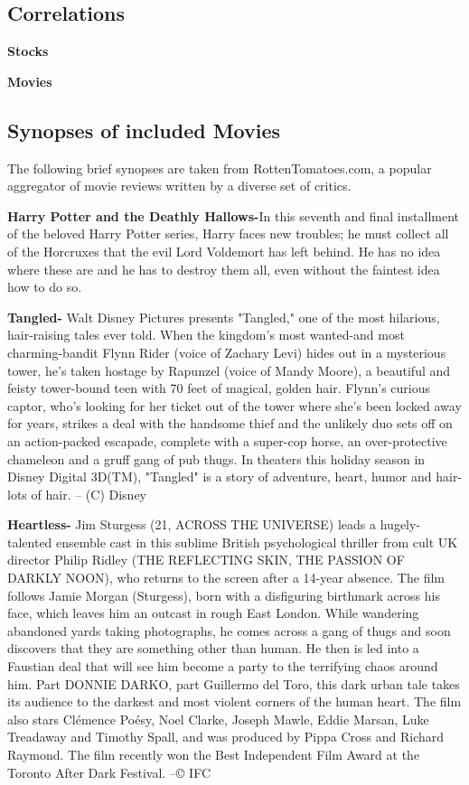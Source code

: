 \documentclass[11pt]{article}
\begin{document}
\subsection{Correlations}
\textbf{Stocks}

\textbf{Movies}
\subsection{Synopses of included Movies}
The following brief synopses are taken from RottenTomatoes.com, a popular aggregator of movie reviews written by a diverse set of critics.

\textbf{Harry Potter and the Deathly Hallows-}In this seventh and final installment of the beloved Harry Potter series, Harry faces new troubles; he must collect all of the Horcruxes that the evil Lord Voldemort has left behind. He has no idea where these are and he has to destroy them all, even without the faintest idea how to do so.
 
\textbf{Tangled-} Walt Disney Pictures presents "Tangled," one of the most hilarious, hair-raising tales ever told. When the kingdom's most wanted-and most charming-bandit Flynn Rider (voice of Zachary Levi) hides out in a mysterious tower, he's taken hostage by Rapunzel (voice of Mandy Moore), a beautiful and feisty tower-bound teen with 70 feet of magical, golden hair. Flynn's curious captor, who's looking for her ticket out of the tower where she's been locked away for years, strikes a deal with the handsome thief and the unlikely duo sets off on an action-packed escapade, complete with a super-cop horse, an over-protective chameleon and a gruff gang of pub thugs. In theaters this holiday season in Disney Digital 3D(TM), "Tangled" is a story of adventure, heart, humor and hair-lots of hair. -- (C) Disney

\textbf{Heartless-} Jim Sturgess (21, ACROSS THE UNIVERSE) leads a hugely-talented ensemble cast in this sublime British psychological thriller from cult UK director Philip Ridley (THE REFLECTING SKIN, THE PASSION OF DARKLY NOON), who returns to the screen after a 14-year absence. The film follows Jamie Morgan (Sturgess), born with a disfiguring birthmark across his face, which leaves him an outcast in rough East London. While wandering abandoned yards taking photographs, he comes across a gang of thugs and soon discovers that they are something other than human. He then is led into a Faustian deal that will see him become a party to the terrifying chaos around him. Part DONNIE DARKO, part Guillermo del Toro, this dark urban tale takes its audience to the darkest and most violent corners of the human heart. The film also stars Clémence Poésy, Noel Clarke, Joseph Mawle, Eddie Marsan, Luke Treadaway and Timothy Spall, and was produced by Pippa Cross and Richard Raymond. The film recently won the Best Independent Film Award at the Toronto After Dark Festival. --© IFC
\end{document}

